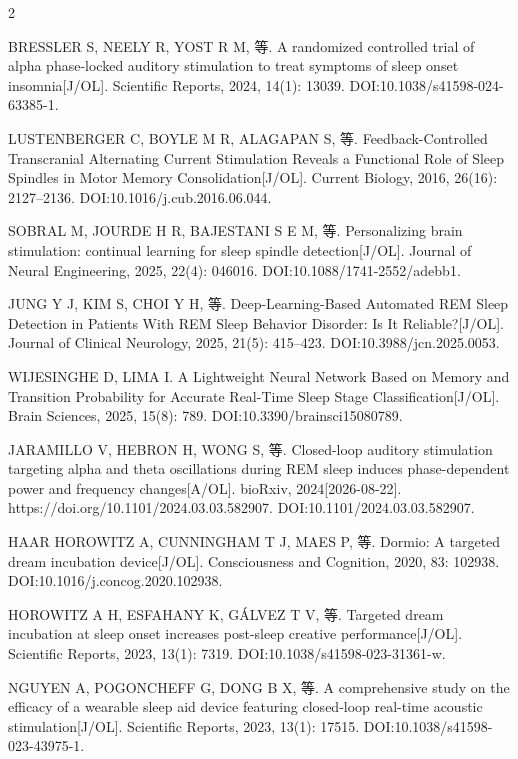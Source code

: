 \documentclass[UTF8,zihao=5,fontset=none]{ctexart}
\begin{document}
\begin{multicols}{2}
{\makebox[25.2pt][l]{[57]}BRESSLER S, NEELY R, YOST R M, 等. A randomized controlled trial of alpha phase-locked auditory stimulation to treat symptoms of sleep onset insomnia[J/OL]. Scientific Reports, 2024, 14(1): 13039. DOI:10.1038/s41598-024-63385-1.\par
\makebox[25.2pt][l]{[58]}LUSTENBERGER C, BOYLE M R, ALAGAPAN S, 等. Feedback-Controlled Transcranial Alternating Current Stimulation Reveals a Functional Role of Sleep Spindles in Motor Memory Consolidation[J/OL]. Current Biology, 2016, 26(16): 2127--2136. DOI:10.1016/j.cub.2016.06.044.\par
\makebox[25.2pt][l]{[59]}SOBRAL M, JOURDE H R, BAJESTANI S E M, 等. Personalizing brain stimulation: continual learning for sleep spindle detection[J/OL]. Journal of Neural Engineering, 2025, 22(4): 046016. DOI:10.1088/1741-2552/adebb1.\par
\makebox[25.2pt][l]{[60]}JUNG Y J, KIM S, CHOI Y H, 等. Deep-Learning-Based Automated REM Sleep Detection in Patients With REM Sleep Behavior Disorder: Is It Reliable?[J/OL]. Journal of Clinical Neurology, 2025, 21(5): 415--423. DOI:10.3988/jcn.2025.0053.\par
\makebox[25.2pt][l]{[61]}WIJESINGHE D, LIMA I. A Lightweight Neural Network Based on Memory and Transition Probability for Accurate Real-Time Sleep Stage Classification[J/OL]. Brain Sciences, 2025, 15(8): 789. DOI:10.3390/brainsci15080789.\par
\makebox[25.2pt][l]{[62]}JARAMILLO V, HEBRON H, WONG S, 等. Closed-loop auditory stimulation targeting alpha and theta oscillations during REM sleep induces phase-dependent power and frequency changes[A/OL]. bioRxiv, 2024[2026-08-22]. https://doi.org/10.1101/2024.03.03.582907. DOI:10.1101/2024.03.03.582907.\par
\makebox[25.2pt][l]{[63]}HAAR HOROWITZ A, CUNNINGHAM T J, MAES P, 等. Dormio: A targeted dream incubation device[J/OL]. Consciousness and Cognition, 2020, 83: 102938. DOI:10.1016/j.concog.2020.102938.\par
\makebox[25.2pt][l]{[64]}HOROWITZ A H, ESFAHANY K, GÁLVEZ T V, 等. Targeted dream incubation at sleep onset increases post-sleep creative performance[J/OL]. Scientific Reports, 2023, 13(1): 7319. DOI:10.1038/s41598-023-31361-w.\par
\makebox[25.2pt][l]{[65]}NGUYEN A, POGONCHEFF G, DONG B X, 等. A comprehensive study on the efficacy of a wearable sleep aid device featuring closed-loop real-time acoustic stimulation[J/OL]. Scientific Reports, 2023, 13(1): 17515. DOI:10.1038/s41598-023-43975-1.\par
}
\end{multicols}
\end{document}
